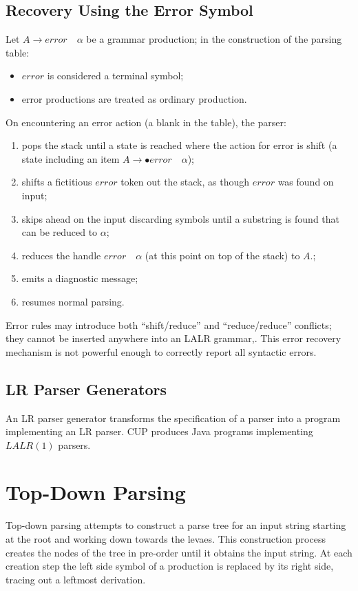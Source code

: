 \subsection{Recovery Using the Error Symbol}
Let $A \to error \quad \alpha$ be a grammar production; in the construction of the parsing table:
\begin{itemize}
    \item $error$ is considered a terminal symbol;
    \item error productions are treated as ordinary production.
\end{itemize}
On encountering an error action (a blank in the table), the parser:
\begin{enumerate}
    \item pops the stack until a state is reached where the action for error is shift (a state including an item $A \to \bullet error \quad \alpha$);
    \item shifts a fictitious $error$ token out the stack, as though $error$ was found on input;
    \item skips ahead on the input discarding symbols until a substring is found that can be reduced to $\alpha$;
    \item reduces the handle $error \quad \alpha$ (at this point on top of the stack) to $A$.;
    \item emits a diagnostic message;
    \item resumes normal parsing.
\end{enumerate}
Error rules may introduce both ``shift/reduce'' and ``reduce/reduce'' conflicts; they cannot be inserted anywhere into an LALR grammar,.
This error recovery mechanism is not powerful enough to correctly report all syntactic errors.

\subsection{LR Parser Generators}
An LR parser generator transforms the specification of a parser into a program implementing an LR parser.
CUP produces Java programs implementing $LALR(1)$ parsers.

\section{Top-Down Parsing}
Top-down parsing attempts to construct a parse tree for an input string starting at the root and working down towards the levaes.
This construction process creates the nodes of the tree in pre-order until it obtains the input string.
At each creation step the left side symbol of a production is replaced by its right side, tracing out a leftmost derivation.

